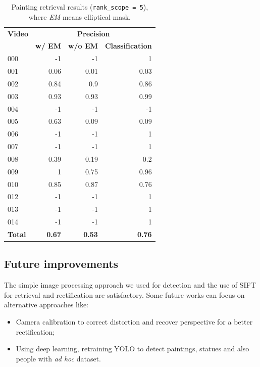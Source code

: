\documentclass[10pt,twocolumn,letterpaper]{article}
\begin{document}
\begin{table}[]
\begin{center}
\begin{tabular}{lrrr}
\multicolumn{1}{c}{\textbf{Video}} & \multicolumn{3}{c}{\textbf{Precision}} \\
\multicolumn{1}{c}{} & \multicolumn{1}{c}{\textbf{w/ EM}} & \multicolumn{1}{c}{\textbf{w/o EM}} & \multicolumn{1}{c}{\textbf{Classification}} \\ \hline \hline
000 & -1 & -1 & 1 \\
001 & 0.06 & 0.01 & 0.03 \\
002 & 0.84 & 0.9 & 0.86 \\
003 & 0.93 & 0.93 & 0.99 \\
004 & -1 & -1 & -1 \\
005 & 0.63 & 0.09 & 0.09 \\
006 & -1 & -1 & 1 \\
007 & -1 & -1 & 1 \\
008 & 0.39 & 0.19 & 0.2 \\
009 & 1 & 0.75 & 0.96 \\
010 & 0.85 & 0.87 & 0.76 \\
012 & -1 & -1 & 1 \\
013 & -1 & -1 & 1 \\
014 & -1 & -1 & 1 \\ \hline \hline
\textbf{Total} & \textbf{0.67} & \textbf{0.53} & \textbf{0.76}
\end{tabular}
\end{center}
\caption{Painting retrieval results (\texttt{rank\_scope = 5}), where \textit{EM} means elliptical mask.}
\label{tab:PaintingRetrievalResults}
\end{table}

\subsection{Future improvements}
\label{subsec:FutureImprovements}
The simple image processing approach we used for detection and the use of SIFT for retrieval and rectification are satisfactory. Some future works can focus on alternative approaches like:
\begin{itemize}
    \item Camera calibration to correct distortion and recover perspective for a better rectification;
    \item Using deep learning, \eg retraining YOLO to detect paintings, statues and also people with \textit{ad hoc} dataset.
\end{itemize}

{\small


}
\end{document}
